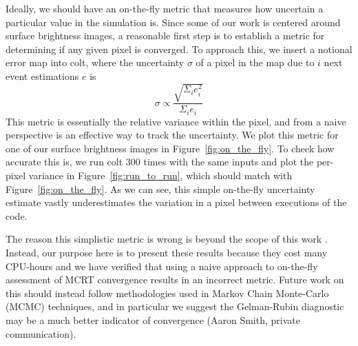 Ideally, we should have an on-the-fly metric that measures how uncertain a particular value in the simulation is.
Since some of our work is centered around surface brightness images, a reasonable first step is to establish a metric for determining if any given pixel is converged.
To approach this, we insert a notional error map into {\sc colt}, where the uncertainty $\sigma$ of a pixel in the map due to $i$ next event estimations $e$ is
\begin{equation}
    \sigma \propto \frac{\sqrt{\Sigma_{i} e_{i}^{2}}}{\Sigma_{i} e_{i}}
    \label{eq:sb_uncertainty}
\end{equation}
This metric is essentially the relative variance within the pixel, and from a naive perspective is an effective way to track the uncertainty.
We plot this metric for one of our surface brightness images in Figure~\ref{fig:on_the_fly}.
To check how accurate this is, we run {\sc colt} 300 times with the same inputs and plot the per-pixel variance in Figure~\ref{fig:run_to_run}, which should match with Figure~\ref{fig:on_the_fly}.
As we can see, this simple on-the-fly uncertainty estimate vastly underestimates the variation in a pixel between executions of the code.

The reason this simplistic metric is wrong is beyond the scope of this work .
Instead, our purpose here is to present these results because they cost many CPU-hours and we have verified that using a naive approach to on-the-fly assessment of MCRT convergence results in an incorrect metric.
Future work on this should instead follow methodologies used in Markov Chain Monte-Carlo (MCMC) techniques, and in particular we suggest the Gelman-Rubin diagnostic may be a much better indicator of convergence (Aaron Smith, private communication).

